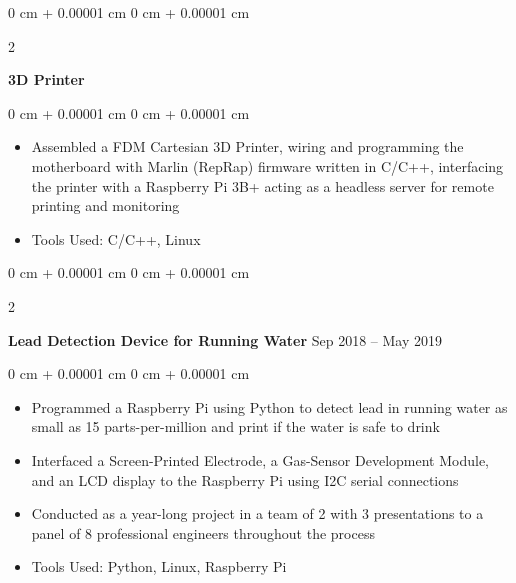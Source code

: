 \documentclass[10pt, letterpaper]{article}
\newenvironment{highlights}{
    \begin{itemize}[
        topsep=0.10 cm,
        parsep=0.10 cm,
        partopsep=0pt,
        itemsep=0pt,
        leftmargin=0 cm + 10pt
    ]
}{
    \end{itemize}
} %
\newenvironment{onecolentry}{
    \begin{adjustwidth}{
        0 cm + 0.00001 cm
    }{
        0 cm + 0.00001 cm
    }
}{
    \end{adjustwidth}
} %
\newenvironment{twocolentry}[2][]{
    \onecolentry
    \def\secondColumn{#2}
    \setcolumnwidth{\fill, 4.5 cm}
    \begin{paracol}{2}
}{
    \switchcolumn \raggedleft \secondColumn
    \end{paracol}
    \endonecolentry
} %
\begin{document}
        \vspace{0.2 cm}

        \begin{twocolentry}{
            
        }
            \textbf{3D Printer}\end{twocolentry}

        \vspace{0.10 cm}
        \begin{onecolentry}
            \begin{highlights}
                \item Assembled a FDM Cartesian 3D Printer, wiring and programming the motherboard with Marlin (RepRap) firmware written in C/C++, interfacing the printer with a Raspberry Pi 3B+ acting as a headless server for remote printing and monitoring
                \item Tools Used: C/C++, Linux
            \end{highlights}
        \end{onecolentry}


        \vspace{0.2 cm}

        \begin{twocolentry}{
            Sep 2018 – May 2019
        }
            \textbf{Lead Detection Device for Running Water}\end{twocolentry}

        \vspace{0.10 cm}
        \begin{onecolentry}
            \begin{highlights}
                \item Programmed a Raspberry Pi using Python to detect lead in running water as small as 15 parts-per-million and print if the water is safe to drink
                \item Interfaced a Screen-Printed Electrode, a Gas-Sensor Development Module, and an LCD display to the Raspberry Pi using I2C serial connections
                \item Conducted as a year-long project in a team of 2 with 3 presentations to a panel of 8 professional engineers throughout the process
                \item Tools Used: Python, Linux, Raspberry Pi
            \end{highlights}
        \end{onecolentry}
\end{document}
